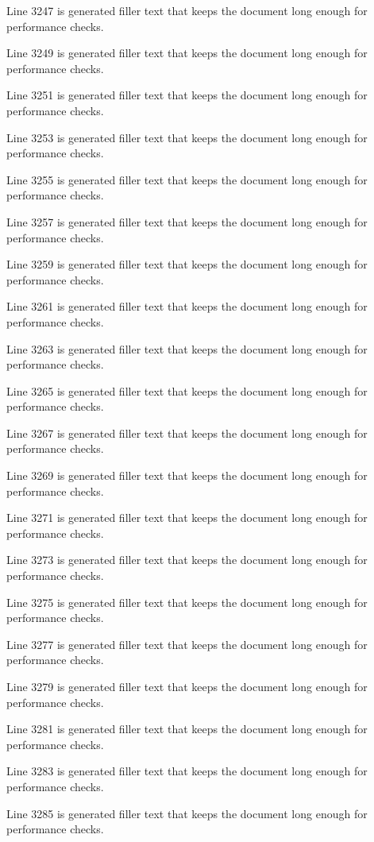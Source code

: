 Line 3247 is generated filler text that keeps the document long enough for performance checks.

Line 3249 is generated filler text that keeps the document long enough for performance checks.

Line 3251 is generated filler text that keeps the document long enough for performance checks.

Line 3253 is generated filler text that keeps the document long enough for performance checks.

Line 3255 is generated filler text that keeps the document long enough for performance checks.

Line 3257 is generated filler text that keeps the document long enough for performance checks.

Line 3259 is generated filler text that keeps the document long enough for performance checks.

Line 3261 is generated filler text that keeps the document long enough for performance checks.

Line 3263 is generated filler text that keeps the document long enough for performance checks.

Line 3265 is generated filler text that keeps the document long enough for performance checks.

Line 3267 is generated filler text that keeps the document long enough for performance checks.

Line 3269 is generated filler text that keeps the document long enough for performance checks.

Line 3271 is generated filler text that keeps the document long enough for performance checks.

Line 3273 is generated filler text that keeps the document long enough for performance checks.

Line 3275 is generated filler text that keeps the document long enough for performance checks.

Line 3277 is generated filler text that keeps the document long enough for performance checks.

Line 3279 is generated filler text that keeps the document long enough for performance checks.

Line 3281 is generated filler text that keeps the document long enough for performance checks.

Line 3283 is generated filler text that keeps the document long enough for performance checks.

Line 3285 is generated filler text that keeps the document long enough for performance checks.

